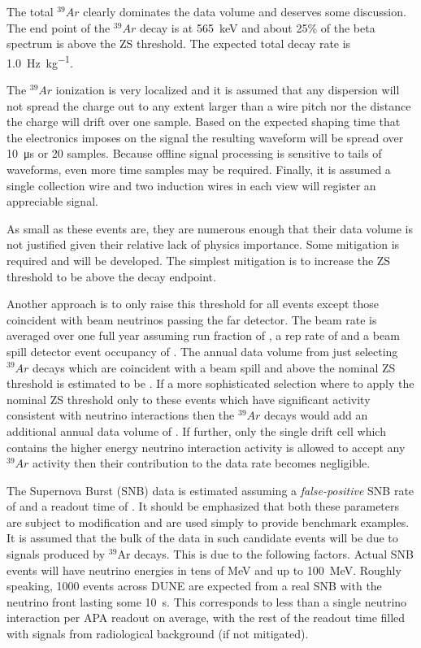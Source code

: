 

The total $^{39}Ar$ clearly dominates the data volume and deserves
some discussion.
The end point of the $^{39}Ar$ decay is at \SI{565}{\keV} and about
25\% of the beta spectrum is above the ZS threshold\cite{docdb3018}.
The expected total decay rate is
\SI{1.0}{\hertz\per\kilo\gram}\cite{bkds}.

The $^{39}Ar$ ionization is very localized and it is assumed that any
dispersion will not spread the charge out to any extent larger than a
wire pitch nor the distance the charge will drift over one sample.
Based on the expected shaping time that the electronics imposes on the
signal the resulting waveform will be spread over
\SI{10}{\micro\second} or \num{20} samples.
Because offline signal processing is sensitive to tails of waveforms,
even more time samples may be required.
Finally, it is assumed a single collection wire and two induction
wires in each view will register an appreciable signal.

As small as these events are, they are numerous enough that their data
volume is not justified given their relative lack of physics importance.
Some mitigation is required and will be developed.
The simplest mitigation is to increase the ZS threshold to be above
the decay endpoint.

Another approach is to only raise this threshold for all events except
those coincident with beam neutrinos passing the far detector.
The beam rate is averaged over one full year assuming run fraction of
\beamrunfraction, a rep rate of \beamreprate and a beam spill detector
event occupancy of \beameventoccupancy.
The annual data volume from just selecting $^{39}Ar$ decays which are
coincident with a beam spill and above the nominal ZS threshold is
estimated to be \betainspillyear.
If a more sophisticated selection where to apply the nominal ZS
threshold only to these events which have significant activity
consistent with neutrino interactions then the $^{39}Ar$ decays would
add an additional annual data volume of \betainbeamyear.
If further, only the single drift cell which contains the higher
energy neutrino interaction activity is allowed to accept any
$^{39}Ar$ activity then their contribution to the data rate becomes
negligible.


The Supernova Burst (SNB) data is estimated assuming a \textit{false-positive} SNB
rate of \snbcandrate and a readout time of \snbreadouttime.
It should be emphasized that both these parameters are subject to
modification and are used simply to provide benchmark examples.
It is assumed that the bulk of the data in such candidate events will be due to signals produced by $^{39}$Ar decays.
This is due to the following factors.
Actual SNB events will have neutrino energies in tens of MeV and up to
\SI{100}{\MeV}.
Roughly speaking, 1000 events across DUNE are expected from a real SNB
with the neutrino front lasting some \SI{10}{\second}. This corresponds to less
than a single neutrino interaction per APA readout on average, with the rest of the readout time
filled with signals from radiological background (if not mitigated).

